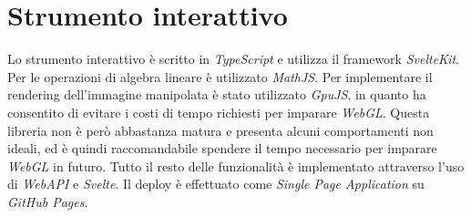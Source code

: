 \section{Strumento interattivo}
Lo strumento interattivo è scritto in \emph{TypeScript}\cite{arch:typescript} e utilizza il framework \emph{SvelteKit}\cite{arch:sveltekit}.
Per le operazioni di algebra lineare è utilizzato \emph{MathJS}\cite{arch:mathjs}.
Per implementare il rendering dell'immagine manipolata è stato utilizzato \emph{GpuJS}\cite{arch:gpujs}, in quanto ha consentito di evitare i costi di tempo richiesti per imparare \emph{WebGL}\cite{arch:webgl}.
Questa libreria non è però abbastanza matura e presenta alcuni comportamenti non ideali, ed è quindi raccomandabile spendere il tempo necessario per imparare \emph{WebGL} in futuro.
Tutto il resto delle funzionalità è implementato attraverso l'uso di \emph{WebAPI}\cite{arch:webapi} e \emph{Svelte}\cite{arch:svelte}.
Il deploy è effettuato come \emph{Single Page Application} su \emph{GitHub Pages}\cite{arch:ghpages}.
